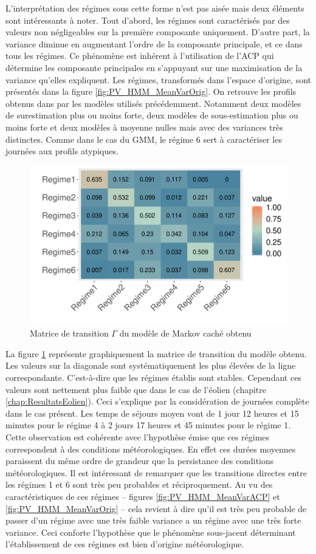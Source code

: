 \documentclass[12pt, french]{report}
\begin{document}
L'interprétation des régimes sous cette forme n'est pas aisée mais deux éléments sont intéressants à noter. Tout d'abord, les régimes sont caractérisés par des valeurs non négligeables sur la première composante uniquement. D'autre part, la variance diminue en augmentant l'ordre de la composante principale, et ce dans tous les régimes. Ce phénomène est inhérent à l'utilisation de l'ACP qui détermine les composante principales en s'appuyant sur une maximisation de la variance qu'elles expliquent. Les régimes, transformés dans l'espace d'origine, sont présentés dans la figure \ref{fig:PV_HMM_MeanVarOrig}. On retrouve les profils obtenus dans par les modèles utilisés précédemment. Notamment deux modèles de surestimation plus ou moins forte, deux modèles de sous-estimation plus ou moins forte et deux modèles à moyenne nulles mais avec des variances très distinctes. Comme dans le cas du GMM, le régime 6 sert à caractériser les journées aux profils atypiques.

\begin{figure}[htbp]
	\centering
	\includegraphics[width = 0.65 \linewidth]{Images/PV/HMM/Transmat.pdf}
	\caption{Matrice de transition $\Gamma$ du modèle de Markov caché obtenu}
	\label{fig:PV_HMM_Transmat}
\end{figure} 


La figure \ref{fig:PV_HMM_Transmat} représente graphiquement la matrice de transition du modèle obtenu. Les valeurs sur la diagonale sont systématiquement les plus élevées de la ligne correspondante. C'est-à-dire que les régimes établis sont stables. Cependant ces valeurs sont nettement plus faible que dans le cas de l'éolien (chapitre \ref{chap:ResultatsEolien}). Ceci s'explique par la considération de journées complète dans le cas présent. Les temps de séjours moyen vont de 1 jour 12 heures et 15 minutes pour le régime 4 à 2 jours 17 heures et 45 minutes pour le régime 1. Cette observation est cohérente avec l'hypothèse émise que ces régimes correspondent à des conditions  météorologiques. En effet ces durées moyennes paraissent du même ordre de grandeur que la persistance des conditions météorologiques. Il est intéressant de remarquer que les transitions directes entre les régimes 1 et 6 sont très peu probables et réciproquement. Au vu des caractéristiques de ces régimes --  figures \ref{fig:PV_HMM_MeanVarACP} et \ref{fig:PV_HMM_MeanVarOrig}  -- cela revient à dire qu'il est très peu probable de passer d'un régime avec une très faible variance a un régime avec une très forte variance.  Ceci conforte l'hypothèse que le phénomène sous-jacent déterminant l'établissement de ces régimes est bien d'origine météorologique.
\end{document}
